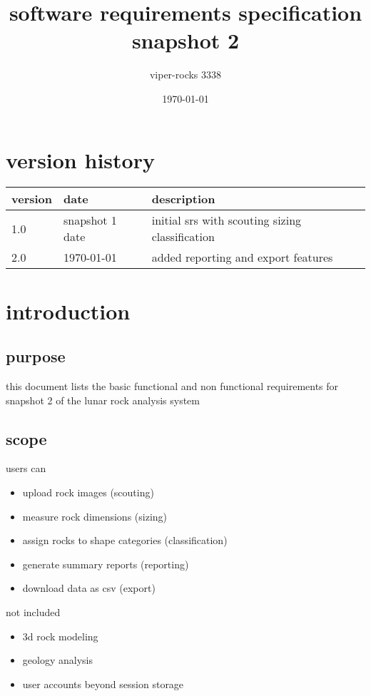 \documentclass{article}
\title{software requirements specification \\ snapshot 2}
\author{viper-rocks 3338}
\date{\today}
\begin{document}
\maketitle

\section*{version history}
\begin{tabular}{|l|l|l|}
\hline
version & date & description \\
\hline
1.0 & snapshot 1 date & initial srs with scouting sizing classification \\
\hline
2.0 & \today & added reporting and export features \\
\hline
\end{tabular}

\tableofcontents
\newpage

\section{introduction}
\subsection{purpose}
this document lists the basic functional and non functional requirements for snapshot 2 of the lunar rock analysis system

\subsection{scope}
users can
\begin{itemize}
  \item upload rock images (scouting)
  \item measure rock dimensions (sizing)
  \item assign rocks to shape categories (classification)
  \item generate summary reports (reporting)
  \item download data as csv (export)
\end{itemize}
not included
\begin{itemize}
  \item 3d rock modeling
  \item geology analysis
  \item user accounts beyond session storage
\end{itemize}
\end{document}
